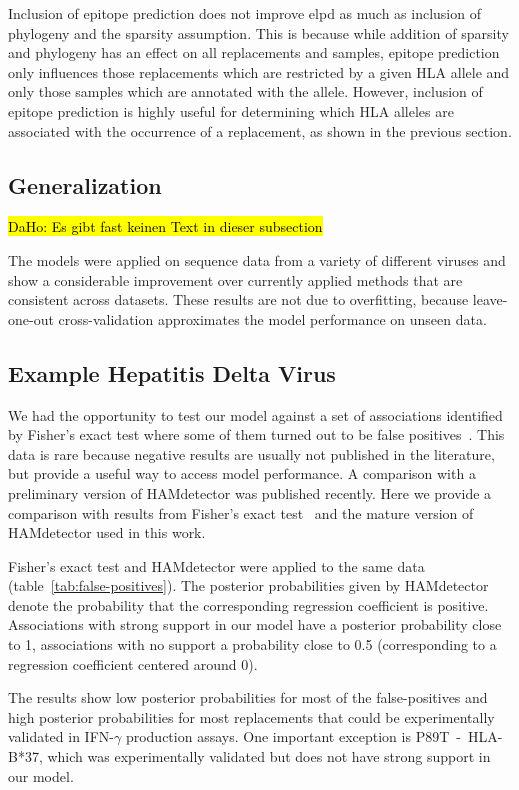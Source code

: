 \documentclass{bioinfo}
\begin{document}
Inclusion of epitope prediction does not improve elpd as much as inclusion of phylogeny and the sparsity assumption. This is because while addition of sparsity and phylogeny has an effect on all replacements and samples, epitope prediction only influences those replacements which are restricted by a given HLA allele and only those samples which are annotated with the allele. However, inclusion of epitope prediction is highly useful for determining which HLA alleles are associated with the occurrence of a replacement, as shown in the previous section.

\subsection{Generalization}

\hl{DaHo: Es gibt fast keinen Text in dieser subsection}

The models were applied on sequence data from a variety of different viruses and show a considerable improvement over currently applied methods that are consistent across datasets.
These results are not due to overfitting, because leave-one-out cross-validation approximates the model performance on unseen data.

\subsection{Example Hepatitis Delta Virus}

We had the opportunity to test our model against a set of associations identified by Fisher's exact test where some of them turned out to be false positives~\cite{Karimzadeh2019}. This data is rare because negative results are usually not published in the literature, but provide a useful way to access model performance.
A comparison with a preliminary version of HAMdetector was published recently. Here we provide a comparison with results from Fisher's exact test~\cite{Budeus2016} and the mature version of HAMdetector used in this work.

Fisher's exact test and HAMdetector were applied to the same data (table~\ref{tab:false-positives}).
The posterior probabilities given by HAMdetector denote the probability that the corresponding regression coefficient is positive. Associations with strong support in our model have a posterior probability close to 1, associations with no support a probability close to 0.5 (corresponding to a regression coefficient centered around 0).

The results show low posterior probabilities for most of the false-positives and high posterior probabilities for most replacements that could be experimentally validated in IFN-\(\gamma\) production assays.
One important exception is P89T~-~HLA-B*37, which was experimentally validated but does not have strong support in our model.
\end{document}
